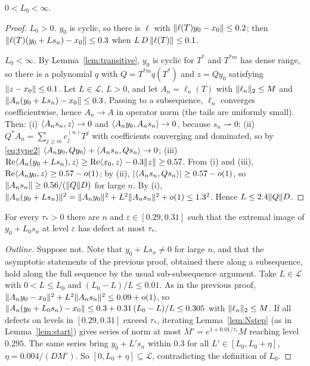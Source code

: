 \begin{proposition}\label{prop:L0}\stproved{}
$0<L_0<\infty$.
\end{proposition}
\begin{proof}
\emph{$L_0>0$.} $y_0$ is cyclic, so there is $\ell$ with $\lVert \ell(T)y_0-x_0\rVert\le0.2$; then
$\lVert \ell(T)(y_0+Ls_n)-x_0\rVert\le0.3$ when $L\,D\,\lVert \ell(T)\rVert\le0.1$.

\emph{$L_0<\infty$.} By Lemma~\ref{lem:transitive}, $y_0$ is cyclic for $T^*$ and $T^{*m}$ has
dense range, so there is a polynomial $q$ with $Q=T^{*m}q(T^*)$ and $z=Qy_0$ satisfying
$\lVert z-x_0\rVert\le0.1$. Let $L\in\mathcal L$, $L>0$, and let $A_n=\ell_n(T)$ with
$\lVert \ell_n\rVert_2\le M$ and $\lVert A_n(y_0+Ls_n)-x_0\rVert\le0.3$. Passing to a subsequence, $\ell_n$
converges coefficientwise, hence $A_n\to A$ in operator norm (the tails are uniformly small).
Then:
(i) $\langle A_ns_n,z\rangle\to0$ and $\langle A_ny_0,A_ns_n\rangle\to0$, because $s_n\rightharpoonup0$;
(ii) $Q^*A_n=\sum_{j\ge m}c^{(n)}_jT^j$ with coefficients converging and dominated, so by
\eqref{eq:type2} $\langle A_ny_0,Qy_0\rangle+\langle A_ns_n,Qs_n\rangle\to0$;
(iii) $\operatorname{Re}\langle A_n(y_0+Ls_n),z\rangle\ge\operatorname{Re}\langle x_0,z\rangle-0.3\lVert z\rVert\ge0.57$.
From (i) and (iii), $\operatorname{Re}\langle A_ny_0,z\rangle\ge0.57-o(1)$; by (ii),
$\lvert \langle A_ns_n,Qs_n\rangle\rvert\ge0.57-o(1)$, so $\lVert A_ns_n\rVert\ge0.56/(\lVert Q\rVert D)$ for large $n$. By (i),
$\lVert A_n(y_0+Ls_n)\rVert^2=\lVert A_ny_0\rVert^2+L^2\lVert A_ns_n\rVert^2+o(1)\le1.3^2$. Hence
$L\le2.4\lVert Q\rVert D$.
\end{proof}

\begin{proposition}[\paper{} ``(47)'']\label{prop:47}\stoutline{}
For every $\tau_*>0$ there are $n$ and $\varepsilon\in[0.29,0.31]$ such that the extremal image
of $y_0+L_0s_n$ at level $\varepsilon$ has defect at most $\tau_*$.
\end{proposition}
\begin{proof}[Outline]
Suppose not. Note that $y_0+L s_n\ne0$ for large $n$, and that the asymptotic statements
of the previous proof, obtained there along a subsequence, hold along the full sequence by
the usual sub-subsequence argument. Take $L\in\mathcal L$ with $0<L\le L_0$ and $(L_0-L)/L\le0.01$. As in the previous
proof, $\lVert A_ny_0-x_0\rVert^2+L^2\lVert A_ns_n\rVert^2\le0.09+o(1)$, so
$\lVert A_n(y_0+L_0s_n)-x_0\rVert\le0.3+0.31\,(L_0-L)/L\le0.305$ with $\lVert \ell_n\rVert_2\le M$.
If all defects on levels in $[0.29,0.31]$ exceed $\tau_*$, iterating Lemma~\ref{lem:Nstep}
(as in Lemma~\ref{lem:start}) gives series of norm at most $M'=e^{1+0.01/\tau_*}M$ reaching
level $0.295$. The same series bring $y_0+L's_n$ within $0.3$ for all $L'\in[L_0,L_0+\eta]$,
$\eta=0.004/(DM')$. So $[0,L_0+\eta]\subseteq\mathcal L$, contradicting the definition of $L_0$.
\end{proof}

